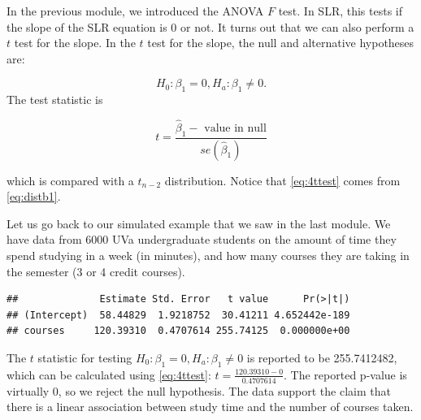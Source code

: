 \documentclass[
]{book}
\newenvironment{Shaded}{\begin{snugshade}}{\end{snugshade}}
\newcommand{\AttributeTok}[1]{\textcolor[rgb]{0.13,0.29,0.53}{#1}}
\newcommand{\DocumentationTok}[1]{\textcolor[rgb]{0.56,0.35,0.01}{\textbf{\textit{#1}}}}
\newcommand{\FunctionTok}[1]{\textcolor[rgb]{0.13,0.29,0.53}{\textbf{#1}}}
\newcommand{\NormalTok}[1]{#1}
\newcommand{\OtherTok}[1]{\textcolor[rgb]{0.56,0.35,0.01}{#1}}
\newcommand{\SpecialCharTok}[1]{\textcolor[rgb]{0.81,0.36,0.00}{\textbf{#1}}}
\begin{document}
In the previous module, we introduced the ANOVA \(F\) test. In SLR, this tests if the slope of the SLR equation is 0 or not. It turns out that we can also perform a \(t\) test for the slope. In the \(t\) test for the slope, the null and alternative hypotheses are:

\[
H_0: \beta_1 = 0, H_a: \beta_1 \neq 0.
\]
The test statistic is

\begin{equation} 
t = \frac{\hat{\beta}_1 - \text{ value in null}}{se(\hat{\beta}_1)}
\label{eq:4ttest}
\end{equation}

which is compared with a \(t_{n-2}\) distribution. Notice that \eqref{eq:4ttest} comes from \eqref{eq:distb1}.

Let us go back to our simulated example that we saw in the last module. We have data from 6000 UVa undergraduate students on the amount of time they spend studying in a week (in minutes), and how many courses they are taking in the semester (3 or 4 credit courses).

\begin{Shaded}
\end{Shaded}

\begin{verbatim}
##              Estimate Std. Error   t value      Pr(>|t|)
## (Intercept)  58.44829  1.9218752  30.41211 4.652442e-189
## courses     120.39310  0.4707614 255.74125  0.000000e+00
\end{verbatim}

The \(t\) statistic for testing \(H_0: \beta_1 = 0, H_a: \beta_1 \neq 0\) is reported to be 255.7412482, which can be calculated using \eqref{eq:4ttest}: \(t= \frac{120.39310 - 0}{0.4707614}\). The reported p-value is virtually 0, so we reject the null hypothesis. The data support the claim that there is a linear association between study time and the number of courses taken.
\end{document}
